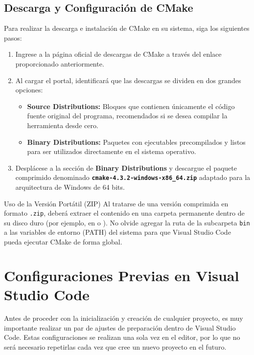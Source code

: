 \documentclass[
10pt, %
a4paper, %
oneside, %
headinclude,footinclude, %
BCOR5mm, %
]{scrartcl}
\begin{document}
\subsection{Descarga y Configuración de CMake}
Para realizar la descarga e instalación de CMake en su sistema, siga los siguientes pasos:
\begin{enumerate}
	\item Ingrese a la página oficial de descargas de CMake a través del enlace proporcionado anteriormente.
	\item Al cargar el portal, identificará que las descargas se dividen en dos grandes opciones:
	\begin{itemize}
		\item \textbf{Source Distributions:} Bloques que contienen únicamente el código fuente original del programa, recomendados si se desea compilar la herramienta desde cero.
		\item \textbf{Binary Distributions:} Paquetes con ejecutables precompilados y listos para ser utilizados directamente en el sistema operativo.
	\end{itemize}
	\item Desplácese a la sección de \textbf{Binary Distributions} y descargue el paquete comprimido denominado \textbf{\texttt{cmake-4.3.2-windows-x86\_64.zip}} adaptado para la arquitectura de Windows de 64 bits.
\end{enumerate}
\begin{InfoBox}{Uso de la Versión Portátil (ZIP)}
	Al tratarse de una versión comprimida en formato \texttt{.zip}, deberá extraer el contenido en una carpeta permanente dentro de su disco duro (por ejemplo, en  o ). No olvide agregar la ruta de la subcarpeta \texttt{bin} a las variables de entorno (PATH) del sistema para que Visual Studio Code pueda ejecutar CMake de forma global.
\end{InfoBox}

\newpage
\section{Configuraciones Previas en Visual Studio Code}
Antes de proceder con la inicialización y creación de cualquier proyecto, es muy importante realizar un par de ajustes de preparación dentro de Visual Studio Code. Estas configuraciones se realizan una sola vez en el editor, por lo que no será necesario repetirlas cada vez que cree un nuevo proyecto en el futuro.
\end{document}
